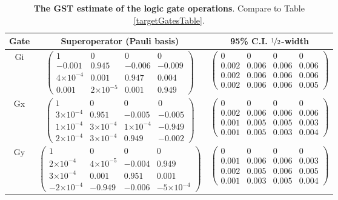 \documentclass{article}[11pt]
\providecommand{\e}[1]{\ensuremath{\times 10^{#1}}}
\begin{document}
\begin{table}[h]
\begin{center}
\begin{tabular}[l]{|c|c|c|}
\hline
Gate & Superoperator (Pauli basis) & 95\% C.I. $\nicefrac{1}{2}$-width \\ \hline
Gi & $ \left(\!\!\begin{array}{cccc}
1 & 0 & 0 & 0 \\ 
-0.001 & 0.945 & -0.006 & -0.009 \\ 
4\e{-4} & 0.001 & 0.947 & 0.004 \\ 
0.001 & 2\e{-5} & 0.001 & 0.949
 \end{array}\!\!\right) $
 & $ \left(\!\!\begin{array}{cccc}
0 & 0 & 0 & 0 \\ 
0.002 & 0.006 & 0.006 & 0.006 \\ 
0.002 & 0.006 & 0.006 & 0.006 \\ 
0.002 & 0.006 & 0.006 & 0.005
 \end{array}\!\!\right) $
 \\ \hline
Gx & $ \left(\!\!\begin{array}{cccc}
1 & 0 & 0 & 0 \\ 
3\e{-4} & 0.951 & -0.005 & -0.005 \\ 
1\e{-4} & 3\e{-4} & 1\e{-4} & -0.949 \\ 
2\e{-4} & 3\e{-4} & 0.949 & -0.002
 \end{array}\!\!\right) $
 & $ \left(\!\!\begin{array}{cccc}
0 & 0 & 0 & 0 \\ 
0.002 & 0.006 & 0.006 & 0.006 \\ 
0.001 & 0.005 & 0.005 & 0.003 \\ 
0.001 & 0.005 & 0.003 & 0.004
 \end{array}\!\!\right) $
 \\ \hline
Gy & $ \left(\!\!\begin{array}{cccc}
1 & 0 & 0 & 0 \\ 
2\e{-4} & 4\e{-5} & -0.004 & 0.949 \\ 
3\e{-4} & 0.001 & 0.951 & 0.001 \\ 
-2\e{-4} & -0.949 & -0.006 & -5\e{-4}
 \end{array}\!\!\right) $
 & $ \left(\!\!\begin{array}{cccc}
0 & 0 & 0 & 0 \\ 
0.001 & 0.006 & 0.006 & 0.003 \\ 
0.002 & 0.005 & 0.006 & 0.005 \\ 
0.001 & 0.003 & 0.005 & 0.004
 \end{array}\!\!\right) $
 \\ \hline
\end{tabular}

\caption{\textbf{The GST estimate of the logic gate operations}.  Compare to Table \ref{targetGatesTable}.\label{bestGatesetGatesTable}}
\end{center}
\end{table}
\end{document}
